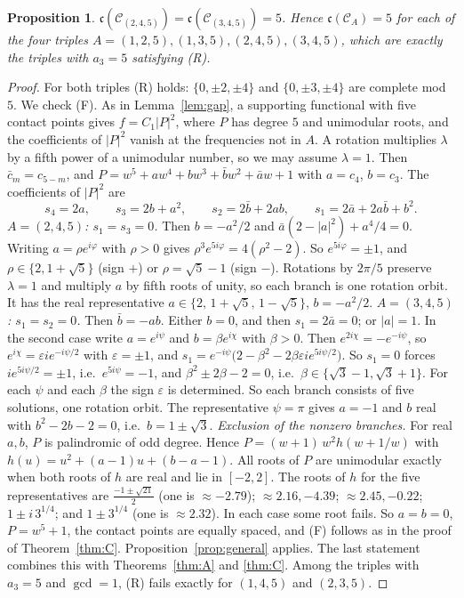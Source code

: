 \documentclass[11pt]{amsart}
\newtheorem{proposition}[theorem]{Proposition}
\theoremstyle{remark}
\newcommand{\cc}{\mathfrak{c}}
\begin{document}
\begin{proposition}\label{prop:N5}
$\cc(\mathcal C_{(2,4,5)})=\cc(\mathcal C_{(3,4,5)})=5$. Hence $\cc(\mathcal C_A)=5$ for each of the four triples $A=(1,2,5),(1,3,5),(2,4,5),(3,4,5)$, which are exactly the triples with $a_3=5$ satisfying (R).
\end{proposition}
\begin{proof}
For both triples (R) holds: $\{0,\pm2,\pm4\}$ and $\{0,\pm3,\pm4\}$ are complete mod $5$. We check (F). As in Lemma~\ref{lem:gap}, a supporting functional with five contact points gives
$f=C_1|P|^2$, where $P$ has degree $5$ and unimodular roots, and the coefficients of $|P|^2$ vanish at the frequencies not in $A$. A rotation multiplies $\lambda$ by a fifth power of a
unimodular number, so we may assume $\lambda=1$. Then $\bar c_m=c_{5-m}$, and $P=w^5+aw^4+bw^3+\bar bw^2+\bar aw+1$ with $a=c_4$, $b=c_3$. The coefficients of $|P|^2$ are
\[
s_4=2a,\qquad s_3=2b+a^2,\qquad s_2=2\bar b+2ab,\qquad s_1=2\bar a+2a\bar b+b^2 .
\]
\emph{$A=(2,4,5)$: $s_1=s_3=0$.} Then $b=-a^2/2$ and $\bar a(2-|a|^2)+a^4/4=0$. Writing $a=\rho e^{i\varphi}$ with $\rho>0$ gives $\rho^3e^{5i\varphi}=4(\rho^2-2)$. So $e^{5i\varphi}=\pm1$, and
$\rho\in\{2,1+\sqrt5\}$ (sign $+$) or $\rho=\sqrt5-1$ (sign $-$). Rotations by $2\pi/5$ preserve $\lambda=1$ and multiply $a$ by fifth roots of unity, so each branch is one rotation orbit. It has the real
representative $a\in\{2,\,1+\sqrt5,\,1-\sqrt5\}$, $b=-a^2/2$.
\emph{$A=(3,4,5)$: $s_1=s_2=0$.} Then $\bar b=-ab$. Either $b=0$, and then $s_1=2\bar a=0$; or $|a|=1$. In the second case write $a=e^{i\psi}$ and $b=\beta e^{i\chi}$ with
$\beta>0$. Then $e^{2i\chi}=-e^{-i\psi}$, so $e^{i\chi}=\varepsilon ie^{-i\psi/2}$ with $\varepsilon=\pm1$, and $s_1=e^{-i\psi}\big(2-\beta^2-2\beta\varepsilon ie^{5i\psi/2}\big)$. So $s_1=0$ forces
$ie^{5i\psi/2}=\pm1$, i.e.\ $e^{5i\psi}=-1$, and $\beta^2\pm2\beta-2=0$, i.e.\ $\beta\in\{\sqrt3-1,\sqrt3+1\}$. For each $\psi$ and each $\beta$ the sign $\varepsilon$ is determined.
So each branch consists of five solutions, one rotation orbit. The representative $\psi=\pi$ gives $a=-1$ and $b$ real with $b^2-2b-2=0$, i.e.\ $b=1\pm\sqrt3$.
\emph{Exclusion of the nonzero branches.} For real $a,b$, $P$ is palindromic of odd degree. Hence $P=(w+1)\,w^2h(w+1/w)$ with $h(u)=u^2+(a-1)u+(b-a-1)$. All roots of $P$ are unimodular
exactly when both roots of $h$ are real and lie in $[-2,2]$. The roots of $h$ for the five representatives are
$\frac{-1\pm\sqrt{21}}2$ (one is $\approx-2.79$); $\approx2.16,-4.39$; $\approx2.45,-0.22$; $1\pm i\,3^{1/4}$; and $1\pm3^{1/4}$ (one is $\approx2.32$). In each case some root fails. So
$a=b=0$, $P=w^5+1$, the contact points are equally spaced, and (F) follows as in the proof of Theorem~\ref{thm:C}. Proposition~\ref{prop:general} applies. The last statement
combines this with Theorems~\ref{thm:A} and \ref{thm:C}. Among the triples with $a_3=5$ and $\gcd=1$, (R) fails exactly for $(1,4,5)$ and $(2,3,5)$.
\end{proof}
\end{document}
